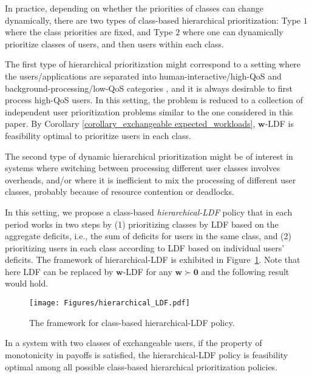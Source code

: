 \documentclass[prodmode,acmtompecs]{acmsmall}
\begin{document}
In practice, depending on whether the priorities of classes can change dynamically, there are two types of class-based hierarchical prioritization: Type $1$ where the class priorities are fixed, and Type $2$ where one can dynamically prioritize classes of users, and then users within each class. 

The first type of hierarchical prioritization might correspond to a setting where the users/applications are separated into human-interactive/high-QoS and background-processing/low-QoS categories \cite{PCO}, and it is always desirable to first process high-QoS users. In this setting, the problem is reduced to a collection of independent user prioritization problems similar to the one considered in this paper. By Corollary \ref{corollary_exchangeable expected_workloads}, $\mathbf{w}$-LDF is feasibility optimal to prioritize users in each class. 

The second type of dynamic hierarchical prioritization might be of interest in systems where switching between processing different user classes involves overheads, and/or where it is inefficient to mix the processing of different user classes, probably because of resource contention or deadlocks. 

In this setting, we propose a class-based {\em hierarchical-LDF} policy that in each period works in two steps by (1) prioritizing classes by LDF based on the aggregate deficits, i.e., the sum of deficits for users in the same class, and (2) prioritizing users in each class according to LDF based on individual users' deficits. 
The framework of hierarchical-LDF is exhibited in Figure{~\ref{fig_hierarchical_LDF}}. 
Note that here LDF can be replaced by $\mathbf{w}$-LDF for any $\mathbf{w} \succ \mathbf{0}$ and the following result would hold. 

\begin{figure}[htp]
  \centering
  \texttt{[image: Figures/hierarchical\_LDF.pdf]}
  \caption{The framework for class-based hierarchical-LDF policy. }
  \label{fig_hierarchical_LDF}
\end{figure} 

\begin{theorem}
\label{thm_optimality_hierarchical_LDF}
In a system with two classes of exchangeable users, if the property of monotonicity in payoffs is satisfied, the hierarchical-LDF policy is feasibility optimal among all possible class-based hierarchical prioritization policies. 
\end{theorem}
\end{document}
